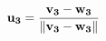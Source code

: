 \documentclass[preview]{standalone}
\begin{document}
\begin{align*}
\mathbf{u_3} = { \mathbf{v_3} - \mathbf{w_3} \over \| \mathbf{v_3} - \mathbf{w_3} \|}
\end{align*}
\end{document}
